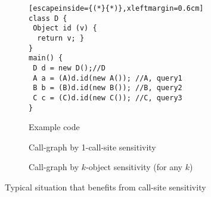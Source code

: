 \begin{figure}[t]	
\begin{multicols}{2}
\vfill\null
\begin{subfigure}[t]{1.3\columnwidth}
\begin{center}
\begin{lstlisting}[escapeinside={(*}{*)},xleftmargin=0.6cm]
class D {
 Object id (v) { 
  return v; }
}
main() {
 D d = new D();//D
 A a = (A)d.id(new A()); //A, query1
 B b = (B)d.id(new B()); //B, query2
 C c = (C)d.id(new C()); //C, query3
}
\end{lstlisting}
\caption{Example code}
\label{background:example2}
\end{center}
\end{subfigure}
\columnbreak



\qquad
\begin{subfigure}[t]{0.80\columnwidth}
	\begin{center}
	\end{center}
	\caption{Call-graph by 1-call-site sensitivity}
	\label{back:cfa:callgraph2}
\end{subfigure}
\qquad\linebreak\linebreak

\qquad
\begin{subfigure}[t]{0.9\columnwidth}
	\begin{center}
	\end{center}
	\caption{Call-graph by $k$-object sensitivity (for any $k$)}
	\label{back:obj:callgraph2}
\end{subfigure}
\end{multicols}
\vspace{-1em}
\caption{Typical situation that benefits from call-site sensitivity}
\label{back:b:Fig}
\vspace{-11pt}
\end{figure}




